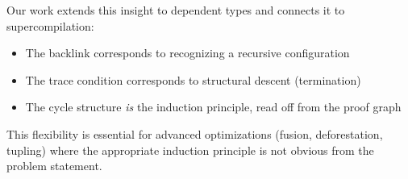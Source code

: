 Our work extends this insight to dependent types and connects it to supercompilation:
\begin{itemize}
\item The backlink corresponds to recognizing a recursive configuration
\item The trace condition corresponds to structural descent (termination)
\item The cycle structure \emph{is} the induction principle, read off from the proof graph
\end{itemize}

This flexibility is essential for advanced optimizations (fusion, deforestation, tupling) where the appropriate induction principle is not obvious from the problem statement.
